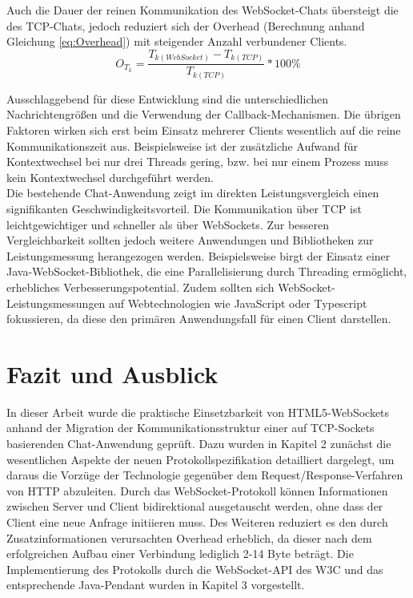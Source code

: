 \documentclass[11pt,a4paper,titlepage]{scrartcl}
\numberwithin{equation}{section}
\begin{document}
\noindent Auch die Dauer der reinen Kommunikation des WebSocket-Chats übersteigt die des TCP-Chats, jedoch reduziert sich der Overhead (Berechnung anhand Gleichung \ref{eq:Overhead}) mit steigender Anzahl verbundener Clients. \\
\begin{equation}\label{eq:Overhead}
	O_{T_{k}} = \dfrac{T_{k (WebSocket)} - T_{k(TCP)}}{T_{k(TCP)}} \ast 100\%
\end{equation}
\vspace*{0.5cm}

\noindent Ausschlaggebend für diese Entwicklung sind die unterschiedlichen Nachrichtengrößen und die Verwendung der Callback-Mechanismen. Die übrigen Faktoren wirken sich erst beim Einsatz mehrerer Clients wesentlich auf die reine Kommunikationszeit aus. Beispielsweise ist der zusätzliche Aufwand für Kontextwechsel bei nur drei Threads gering, bzw. bei nur einem Prozess muss kein Kontextwechsel durchgeführt werden. \\

\noindent Die bestehende Chat-Anwendung zeigt im direkten Leistungsvergleich einen signifikanten Geschwindigkeitsvorteil. Die Kommunikation über TCP ist leichtgewichtiger und schneller als über WebSockets. Zur besseren Vergleichbarkeit sollten jedoch weitere Anwendungen und Bibliotheken zur Leistungsmessung herangezogen werden. Beispielsweise birgt der Einsatz einer Java-WebSocket-Bibliothek, die eine Parallelisierung durch Threading ermöglicht, erhebliches Verbesserungspotential. Zudem sollten sich WebSocket-Leistungsmessungen auf Webtechnologien wie JavaScript oder Typescript fokussieren, da diese den primären Anwendungsfall für einen Client darstellen. 

\newpage
\section{Fazit und Ausblick}
In dieser Arbeit wurde die praktische Einsetzbarkeit von HTML5-WebSockets anhand der Migration der Kommunikationsstruktur einer auf TCP-Sockets basierenden Chat-Anwendung geprüft. Dazu wurden in Kapitel 2 zunächst die wesentlichen Aspekte der neuen Protokollspezifikation detailliert dargelegt, um daraus die Vorzüge der Technologie gegenüber dem Request/Response-Verfahren von HTTP abzuleiten. Durch das WebSocket-Protokoll können Informationen zwischen Server und Client bidirektional ausgetauscht werden, ohne dass der Client eine neue Anfrage initiieren muss. Des Weiteren reduziert es den durch Zusatzinformationen verursachten Overhead erheblich, da dieser nach dem erfolgreichen Aufbau einer Verbindung lediglich 2-14 Byte beträgt. Die Implementierung des Protokolls durch die WebSocket-API des W3C und das entsprechende Java-Pendant wurden in Kapitel 3 vorgestellt.\\
\end{document}
